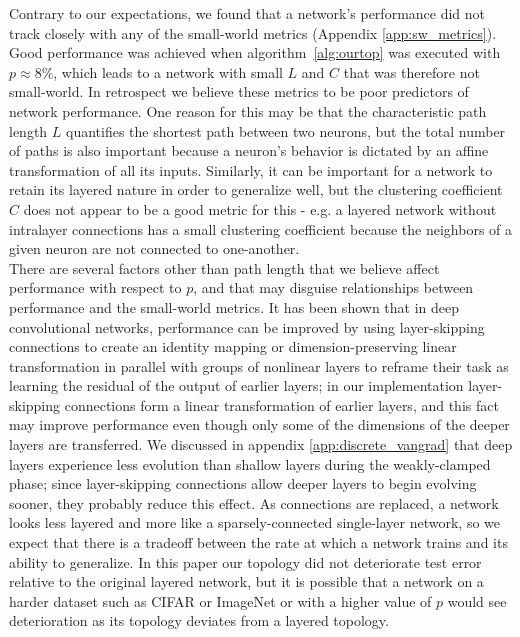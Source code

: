 \documentclass[format=sigconf]{acmart}
\newcommand{\npar}{\\\indent}
\begin{document}
Contrary to our expectations, we found that a network's performance did not track closely with any of the small-world metrics (Appendix \ref{app:sw_metrics}). Good performance was achieved when algorithm~\ref{alg:ourtop} was executed with $p\approx 8\%$, which leads to a network with small $L$ and $C$ that was therefore not small-world. In retrospect we believe these metrics to be poor predictors of network performance. One reason for this may be that the characteristic path length $L$ quantifies the shortest path between two neurons, but the total number of paths is also important because a neuron's behavior is dictated by an affine transformation of all its inputs. Similarly, it can be important for a network to retain its layered nature in order to generalize well, but the clustering coefficient $C$ does not appear to be a good metric for this - e.g. a layered network without intralayer connections has a small clustering coefficient because the neighbors of a given neuron are not connected to one-another.
\npar
There are several factors other than path length that we believe affect performance with respect to $p$, and that may disguise relationships between performance and the small-world metrics. It has been shown \cite{he2015, ioffe2015} that in deep convolutional networks, performance can be improved by using layer-skipping connections to create an identity mapping or dimension-preserving linear transformation in parallel with groups of nonlinear layers to reframe their task as learning the residual of the output of earlier layers; in our implementation layer-skipping connections form a linear transformation of earlier layers, and this fact may improve performance even though only some of the dimensions of the deeper layers are transferred. We discussed in appendix \ref{app:discrete_vangrad} that deep layers experience less evolution than shallow layers during the weakly-clamped phase; since layer-skipping connections allow deeper layers to begin evolving sooner, they probably reduce this effect. As connections are replaced, a network looks less layered and more like a sparsely-connected single-layer network, so we expect that there is a tradeoff between the rate at which a network trains and its ability to generalize. In this paper our topology did not deteriorate test error relative to the original layered network, but it is possible that a network on a harder dataset such as CIFAR or ImageNet or with a higher value of $p$ would see deterioration as its topology deviates from a layered topology.
\end{document}
